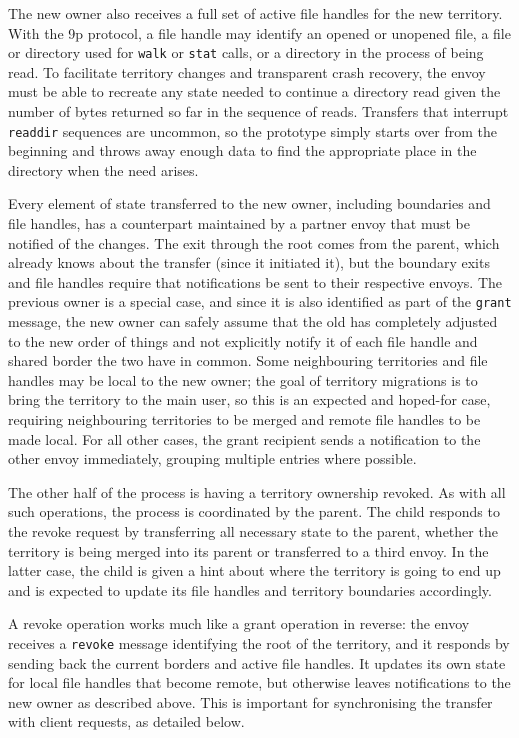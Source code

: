 The new owner also receives a full set of active file handles for the new territory. With the 9p protocol, a file handle may identify an opened or unopened file, a file or directory used for \texttt{walk} or \texttt{stat} calls, or a directory in the process of being read. To facilitate territory changes and transparent crash recovery, the envoy must be able to recreate any state needed to continue a directory read given the number of bytes returned so far in the sequence of reads. Transfers that interrupt \texttt{readdir} sequences are uncommon, so the prototype simply starts over from the beginning and throws away enough data to find the appropriate place in the directory when the need arises.

Every element of state transferred to the new owner, including boundaries and file handles, has a counterpart maintained by a partner envoy that must be notified of the changes. The exit through the root comes from the parent, which already knows about the transfer (since it initiated it), but the boundary exits and file handles require that notifications be sent to their respective envoys. The previous owner is a special case, and since it is also identified as part of the \texttt{grant} message, the new owner can safely assume that the old has completely adjusted to the new order of things and not explicitly notify it of each file handle and shared border the two have in common. Some neighbouring territories and file handles may be local to the new owner; the goal of territory migrations is to bring the territory to the main user, so this is an expected and hoped-for case, requiring neighbouring territories to be merged and remote file handles to be made local. For all other cases, the grant recipient sends a notification to the other envoy immediately, grouping multiple entries where possible.

The other half of the process is having a territory ownership revoked. As with all such operations, the process is coordinated by the parent. The child responds to the revoke request by transferring all necessary state to the parent, whether the territory is being merged into its parent or transferred to a third envoy. In the latter case, the child is given a hint about where the territory is going to end up and is expected to update its file handles and territory boundaries accordingly.

A revoke operation works much like a grant operation in reverse: the envoy receives a \texttt{revoke} message identifying the root of the territory, and it responds by sending back the current borders and active file handles. It updates its own state for local file handles that become remote, but otherwise leaves notifications to the new owner as described above. This is important for synchronising the transfer with client requests, as detailed below.


